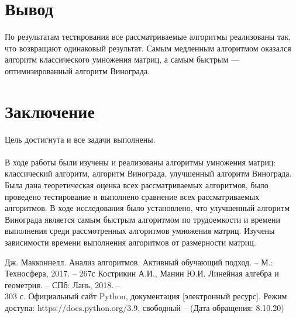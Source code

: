 \documentclass[12pt,a4paper]{article}
\numberwithin{equation}{section}
\begin{document}
\section*{Вывод}
\qquad По результатам тестирования все рассматриваемые алгоритмы реализованы так, что возвращают одинаковый результат. Самым медленным алгоритмом оказался алгоритм классического умножения матриц, а самым быстрым — оптимизированный алгоритм Винограда.
\clearpage
{}
\section*{\Huge Заключение}
Цель достигнута и все задачи выполнены. \\\\
В ходе работы были изучены  и реализованы алгоритмы умножения матриц: классический алгоритм, алгоритм Винограда, улучшенный алгоритм
Винограда. Была дана теоретическая оценка всех рассматриваемых алгоритмов, было проведено тестирование и выполнено сравнение всех рассматриваемых алгоритмов. В ходе исследования было установлено, что улучшенный алгоритм Винограда является самым быстрым алгоритмом по трудоемкости и времени выполнения среди рассмотренных алгоритмов умножения матриц. Изучены зависимости времени выполнения алгоритмов от размерности матриц.

\clearpage

\begin{thebibliography}{}
	\bibitem{}  Дж. Макконнелл. Анализ алгоритмов. Активный обучающий подход. – М.: Техносфера, 2017. – 267с
	\bibitem{}  Кострикин А.И., Манин Ю.И. Линейная алгебра и геометрия. -- СПб: Лань, 2018. --\\ 303 с.
	Официальный сайт Python, документация [электронный ресурс]. Режим доступа: https://docs.python.org/3.9, свободный – (Дата обращения: 8.10.20)
\end{thebibliography}
\end{document}
